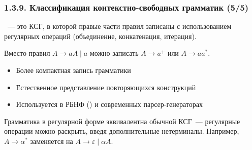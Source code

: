 \begin{frame}
\frametitle{1.3.9. Классификация контекстно-свободных грамматик (5/5)}

~--- 
это КСГ, в которой правые части правил записаны с использованием 
регулярных операций (объединение, конкатенация, итерация).

\begin{example}
Вместо правил $A \to aA \mid a$ можно записать $A \to a^+$ или $A \to aa^*$.
\end{example}

\begin{itemize}
\item Более компактная запись грамматики
\item Естественное представление повторяющихся конструкций
\item Используется в РБНФ () и современных парсер-генераторах
\end{itemize}

\begin{remark}
Грамматика в регулярной форме эквивалентна обычной КСГ~--- 
регулярные операции можно раскрыть, введя дополнительные нетерминалы.
Например, $A \to \alpha^*$ заменяется на $A \to \varepsilon \mid \alpha A$.
\end{remark}

\bigskip
{}

\end{frame}


